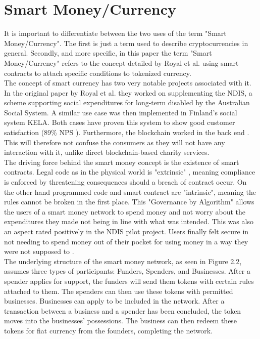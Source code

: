 \section{Smart Money/Currency}
It is important to differentiate between the two uses of the term "Smart Money/Currency". The first is just a term used to describe cryptocurrencies in general. Secondly, and more specific, in this paper the term "Smart Money/Currency" refers to the concept detailed by Royal et al.\cite{royal} using smart contracts to attach specific conditions to tokenized currency.\\
The concept of smart currency has two very notable projects associated with it. In the original paper by Royal et al.\cite{royal} they worked on supplementing the NDIS, a scheme supporting social expenditures for long-term disabled by the Australian Social System. A similar use case was then implemented in Finland's social system KELA. Both cases have proven this system to show good customer satisfaction (89\% NPS \cite{weber}). Furthermore, the blockchain worked in the back end \cite{weber}\cite{kela}\cite{royal}. This will therefore not confuse the consumers as they will not have any interaction with it, unlike direct blockchain-based charity services.\\
The driving force behind the smart money concept is the existence of smart contracts. Legal code as in the physical world is "extrinsic" \cite{tackle}, meaning compliance is enforced by threatening consequences should a breach of contract occur. 
On the other hand programmed code and smart contract are "intrinsic", meaning the rules cannot be broken in the first place. This "Governance by Algorithm"\cite{tackle} allows the users of a smart money network to spend money and not worry about the expenditures they made not being in line with what was intended. This was also an aspect rated positively in the NDIS pilot project. Users finally felt secure in not needing to spend money out of their pocket for using money in a way they were not supposed to \cite{weber}\cite{tackle}.\\
The underlying structure of the smart money network, as seen in Figure 2.2, assumes three types of participants: Funders, Spenders, and Businesses. After a spender applies for support, the funders will send them tokens with certain rules attached to them. The spenders can then use these tokens with permitted businesses. Businesses can apply to be included in the network. After a transaction between a business and a spender has been concluded, the token moves into the businesses' possessions. The business can then redeem these tokens for fiat currency from the founders, completing the network.\\
